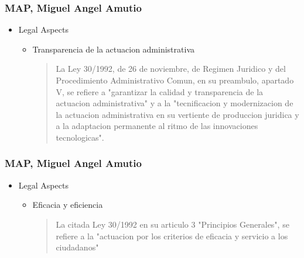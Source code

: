 \documentclass{beamer}
\begin{document}
\begin{frame}
\frametitle{ MAP, Miguel Angel Amutio}

\begin{itemize}
\item Legal Aspects
\begin {itemize}
	\item Transparencia de la actuacion administrativa
	\begin{quote} 
	La Ley 30/1992, de 26 de noviembre, de Regimen Juridico y del Procedimiento Administrativo Comun, en su preambulo,
apartado V, se refiere a "garantizar la calidad y transparencia de la actuacion administrativa" y a la "tecnificacion y
modernizacion de la actuacion administrativa en su vertiente de produccion juridica y a la adaptacion permanente al ritmo de las
innovaciones tecnologicas".

	\end{quote}
\end {itemize}
\end{itemize}

\end{frame}



\begin{frame}
\frametitle{ MAP, Miguel Angel Amutio}

\begin{itemize}
\item Legal Aspects
\begin {itemize}
	\item Eficacia y eficiencia
	\begin{quote} 
La citada Ley 30/1992 en su articulo 3 "Principios Generales", se refiere a la "actuacion por los criterios de eficacia y
servicio a los ciudadanos"

	\end{quote}
\end {itemize}
\end{itemize}

\end{frame}
\end{document}
